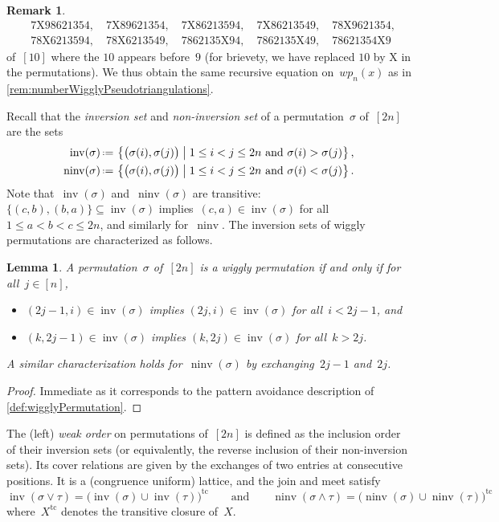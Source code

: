 \documentclass{amsart}
\newtheorem{lemma}[theorem]{Lemma}
\theoremstyle{definition}
\newtheorem{remark}[theorem]{Remark}
\newcommand{\set}[2]{\left\{ #1 \;\middle|\; #2 \right\}} %
\newcommand{\eqdef}{\mbox{\,\raisebox{0.2ex}{\scriptsize\ensuremath{\mathrm:}}\ensuremath{=}\,}} %
\DeclareMathOperator{\inv}{inv} %
\DeclareMathOperator{\ninv}{ninv} %
\newcommand{\darkblue}{\color{darkblue}} %
\newcommand{\defn}[1]{\textsl{\darkblue #1}} %
\newcommand{\meet}{\wedge} %
\newcommand{\join}{\vee} %
\begin{document}
\begin{remark}
\begin{align*}
& 7\mathrm{X}98621354, \quad 7\mathrm{X}89621354, \quad 7\mathrm{X}86213594, \quad 7\mathrm{X}86213549, \quad 78\mathrm{X}9621354, \\
& 78\mathrm{X}6213594, \quad 78\mathrm{X}6213549, \quad 7862135\mathrm{X}94, \quad 7862135\mathrm{X}49, \quad 78621354\mathrm{X}9
\end{align*}
of~$[10]$ where the $10$ appears before~$9$ (for brievety, we have replaced $10$ by $\mathrm{X}$ in the permutations).
We thus obtain the same recursive equation on~$wp_n(x)$ as in \cref{rem:numberWigglyPseudotriangulations}.
\end{remark}

Recall that the \defn{inversion set} and \defn{non-inversion set} of a permutation~$\sigma$ of~$[2n]$ are the sets
\begin{align*}
\inv(\sigma) & \eqdef \set{\big( \sigma(i), \sigma(j) \big)}{1 \le i < j \le 2n \text{ and } \sigma(i) > \sigma(j)}, \\
\ninv(\sigma) & \eqdef \set{\big( \sigma(i), \sigma(j) \big)}{1 \le i < j \le 2n \text{ and } \sigma(i) < \sigma(j)}.
\end{align*}
Note that~$\inv(\sigma)$ and~$\ninv(\sigma)$ are transitive: $\{(c,b), (b,a)\} \subseteq \inv(\sigma)$ implies~$(c,a) \in \inv(\sigma)$ for all~${1 \le a < b < c \le 2n}$, and similarly for~$\ninv$.
The inversion sets of wiggly permutations are characterized as follows.

\begin{lemma}
\label{lem:inversionSetsWigglyPermutations}
A permutation~$\sigma$ of~$[2n]$ is a wiggly permutation if and only if for all~$j \in [n]$,
\begin{itemize}
\item $(2j-1, i) \in \inv(\sigma)$ implies $(2j, i) \in \inv(\sigma)$ for all~$i < 2j-1$, and
\item $(k, 2j-1) \in \inv(\sigma)$ implies $(k, 2j) \in \inv(\sigma)$ for all~$k > 2j$.
\end{itemize}
A similar characterization holds for~$\ninv(\sigma)$ by exchanging~$2j-1$ and~$2j$.
\end{lemma}

\begin{proof}
Immediate as it corresponds to the pattern avoidance description of \cref{def:wigglyPermutation}.
\end{proof}

The (left) \defn{weak order} on permutations of~$[2n]$ is defined as the inclusion order of their inversion sets (or equivalently, the reverse inclusion of their non-inversion sets).
Its cover relations are given by the exchanges of two entries at consecutive positions.
It is a (congruence uniform) lattice, and the join and meet satisfy
\[
\inv(\sigma \join \tau) = \big( \inv(\sigma) \cup \inv(\tau) \big)^\textrm{tc}
\qquad\text{and}\qquad
\ninv(\sigma \meet \tau) = \big( \ninv(\sigma) \cup \ninv(\tau) \big)^\textrm{tc}
\]
where~$X^\mathrm{tc}$ denotes the transitive closure of~$X$.
\end{document}

